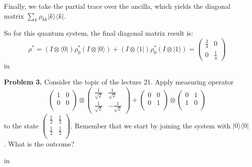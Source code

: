 \documentclass[11pt]{article}
\begin{document}
Finally, we take the partial trace over the ancilla, which yields the diagonal matrix $\sum_{k}\rho_{kk}|k\rangle\langle k|$. 

So for this quantum system, the final diagonal matrix result is:
$$
\rho^*=(I\otimes \langle0|)\rho_0^*(I\otimes |0\rangle)+(I\otimes \langle1|)\rho_0^*(I\otimes |1\rangle)=\begin{pmatrix}
	\frac{3}{4}&0\\
	0&\frac{1}{4}
\end{pmatrix}
$$
 in

{\bf Problem 3.} Consider the topic of the lecture 21. Apply measuring operator $$\begin{pmatrix}
	1&0\\
	0&0\\
\end{pmatrix}\otimes \begin{pmatrix}
\frac{1}{\sqrt{2}}&\frac{1}{\sqrt{2}}\\
\frac{1}{\sqrt{2}}&-\frac{1}{\sqrt{2}}
\end{pmatrix}+\begin{pmatrix}
0&0\\
0&1\\
\end{pmatrix}\otimes\begin{pmatrix}
0&1\\
1&0\\
\end{pmatrix}$$
to the state $\begin{pmatrix}
	\frac{1}{2}&\frac{1}{2}\\
	\frac{1}{2}&\frac{1}{2}\\
\end{pmatrix}$. Remember that we start by joining the system with $|0\rangle\langle0|$. What is the outcome?

 in
\end{document}
